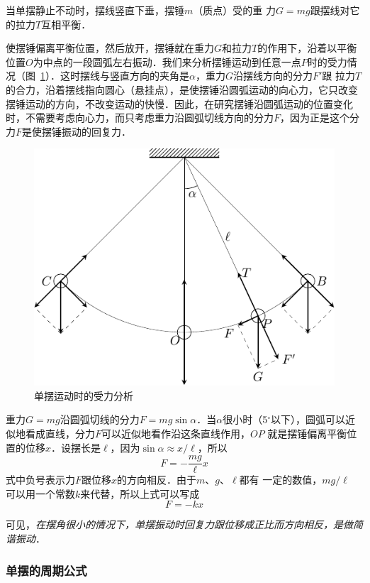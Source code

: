 当单摆静止不动时，摆线竖直下垂，摆锤$m$（质点）受的重
力$G=mg$跟摆线对它的拉力$T$互相平衡．

使摆锤偏离平衡位置，然后放开，摆锤就在重力$G$和拉力$T$的作用下，沿着以平衡位置$O$为中点的一段圆弧左右振动．我们来分析摆锤运动到任意一点$P$时的受力情况（图~\ref{fig_A_9-3}）．这时摆线与竖直方向的夹角是$\alpha$，重力$G$沿摆线方向的分力$F'$跟
拉力$T$的合力，沿着摆线指向圆心（悬挂点），是使摆锤沿圆弧运动的向心力，它只改变摆锤运动的方向，不改变运动的快慢．因此，在研究摆锤沿圆弧运动的位置变化时，不需要考虑向心力，而只考虑重力沿圆弧切线方向的分力$F$，因为正是这个分力$F$是使摆锤振动的回复力．
\begin{figure}[htbp]
    \centering
    \includegraphics{fig/A/9-3.pdf}
    \caption{单摆运动时的受力分析}\label{fig_A_9-3}
\end{figure}
    
重力$G=mg$沿圆弧切线的分力$F=mg\sin\alpha$．当$\alpha$很小时（5$^\circ$以下），圆弧可以近似地看成直线，分力$F$可以近似地看作沿这条直线作用，$OP$ 就是摆锤偏离平衡位置的位移$x$．设摆长是$\ell$，因为$\sin\alpha\approx x/\ell$，所以
\[F=-\frac{mg}{\ell}x\]
式中负号表示力$F$跟位移$x$的方向相反．由于$m$、$g$、$\ell$都有
一定的数值，$mg/\ell$
可以用一个常数$k$来代替，所以上式可以写成
\[F=-kx\]

可见，\textit{在摆角很小的情况下，单摆振动时回复力跟位移成正比而方向相反，是做简谐振动}．

\subsubsection{单摆的周期公式}

